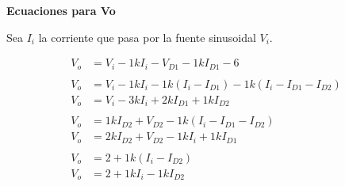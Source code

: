%
%
%

\textbf{Ecuaciones para Vo}

Sea $I_i$ la corriente que pasa por la fuente sinusoidal $V_i$.


\begin{align}
  V_o &= V_i - 1k I_i - V_{D1} - 1k I_{D1} - 6 \label{p3:inicio:vo1}
  \\
  \nonumber \\
  V_o &= V_i - 1k I_i - 1k (I_i - I_{D1}) - 1k (I_i - I_{D1} - I_{D2}) \nonumber
  \\
  V_o &= V_i - 3k I_i + 2k I_{D1} + 1k I_{D2} \label{p3:inicio:vo2}
  \\
  \nonumber \\
  V_o &= 1k I_{D2} + V_{D2} - 1k (I_i - I_{D1} - I_{D2}) \nonumber
  \\
  V_o &= 2k I_{D2} + V_{D2} - 1k I_i + 1k I_{D1} \label{p3:inicio:vo3}
  \\
  \nonumber \\
  V_o &= 2 + 1k (I_i - I_{D2}) \nonumber
  \\
  V_o &= 2 + 1k I_i - 1k I_{D2} \label{p3:inicio:vo4}
\end{align}

